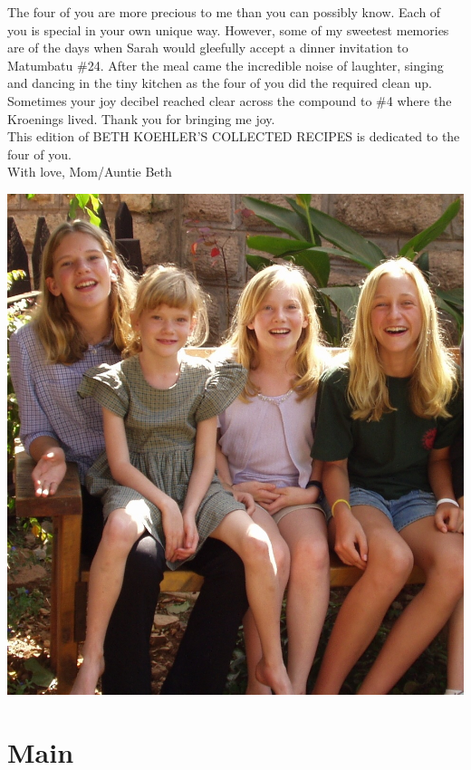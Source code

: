 \documentclass[letterpaper, 12pt]{memoir} %
\begin{document}
The four of you are more precious to me than you can possibly know. Each of you is special in your own unique way. However, some of my sweetest memories are of the days when Sarah would gleefully accept a dinner invitation to Matumbatu \#24. After the meal came the incredible noise of laughter, singing and dancing in the tiny kitchen as the four of you did the required clean up. Sometimes your joy decibel reached clear across the compound to \#4 where the Kroenings lived. Thank you for bringing me joy. \\[10pt]

This edition of BETH KOEHLER'S COLLECTED RECIPES is dedicated to the four of you. \\[10pt]

\hspace{0.5\linewidth}With love, Mom/Auntie Beth

\centerline{\includegraphics[width=0.75\linewidth]{Girls.jpg}}


\part{Main}






\end{document}
